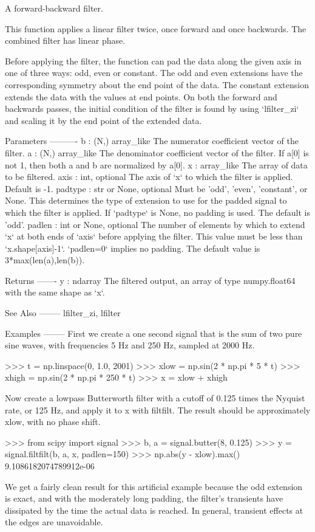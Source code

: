 \begin{DoxyVerb}A forward-backward filter.

This function applies a linear filter twice, once forward
and once backwards.  The combined filter has linear phase.

Before applying the filter, the function can pad the data along the
given axis in one of three ways: odd, even or constant.  The odd
and even extensions have the corresponding symmetry about the end point
of the data.  The constant extension extends the data with the values
at end points.  On both the forward and backwards passes, the
initial condition of the filter is found by using `lfilter_zi` and
scaling it by the end point of the extended data.

Parameters
----------
b : (N,) array_like
    The numerator coefficient vector of the filter.
a : (N,) array_like
    The denominator coefficient vector of the filter.  If a[0]
    is not 1, then both a and b are normalized by a[0].
x : array_like
    The array of data to be filtered.
axis : int, optional
    The axis of `x` to which the filter is applied.
    Default is -1.
padtype : str or None, optional
    Must be 'odd', 'even', 'constant', or None.  This determines the
    type of extension to use for the padded signal to which the filter
    is applied.  If `padtype` is None, no padding is used.  The default
    is 'odd'.
padlen : int or None, optional
    The number of elements by which to extend `x` at both ends of
    `axis` before applying the filter. This value must be less than
    `x.shape[axis]-1`.  `padlen=0` implies no padding.
    The default value is 3*max(len(a),len(b)).

Returns
-------
y : ndarray
    The filtered output, an array of type numpy.float64 with the same
    shape as `x`.

See Also
--------
lfilter_zi, lfilter

Examples
--------
First we create a one second signal that is the sum of two pure sine
waves, with frequencies 5 Hz and 250 Hz, sampled at 2000 Hz.

>>> t = np.linspace(0, 1.0, 2001)
>>> xlow = np.sin(2 * np.pi * 5 * t)
>>> xhigh = np.sin(2 * np.pi * 250 * t)
>>> x = xlow + xhigh

Now create a lowpass Butterworth filter with a cutoff of 0.125 times
the Nyquist rate, or 125 Hz, and apply it to x with filtfilt.  The
result should be approximately xlow, with no phase shift.

>>> from scipy import signal
>>> b, a = signal.butter(8, 0.125)
>>> y = signal.filtfilt(b, a, x, padlen=150)
>>> np.abs(y - xlow).max()
9.1086182074789912e-06

We get a fairly clean result for this artificial example because
the odd extension is exact, and with the moderately long padding,
the filter's transients have dissipated by the time the actual data
is reached.  In general, transient effects at the edges are
unavoidable.\end{DoxyVerb}
 \hypertarget{namespacescipy_1_1signal_1_1signaltools_a565c325a63c17a4a22bca39e9b118cf3}{}
